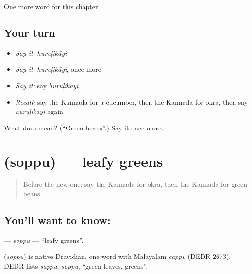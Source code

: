 \begin{grammarlens}[title={What you've built}]
One more word for this chapter.
\end{grammarlens}

\subsection*{Your turn}
\begin{itemize}
\raggedright
  \item \emph{Say it:} \emph{huruḷikāyi}
  \item \emph{Say it:} \emph{huruḷikāyi}, once more
  \item \emph{Say it:} say \emph{huruḷikāyi}
  \item \emph{Recall:} say the Kannada for a cucumber, then the Kannada for okra, then say \emph{huruḷikāyi} again
\end{itemize}

\begin{tcolorbox}[breakable,colback=teal!4,colframe=teal!35!black,title={Before you move on}]
What does  mean? (\textquotedblleft{}Green beans\textquotedblright{}.) Say it once more.
\end{tcolorbox}
\section[\texorpdfstring{\kn{ಸೊಪ್ಪು} (soppu)}{ಸೊಪ್ಪು (soppu)}]{ (soppu) — leafy greens}

\label{lesson:KA-C184-soppu}



\begin{quote}
Before the new one: say the Kannada for okra, then the Kannada for green beans.
\end{quote}

\subsection*{You'll want to know: }
\textbf{} — \emph{soppu} — \textquotedblleft{}leafy greens\textquotedblright{}.

\begin{cousinweb}
\textbf{} (\emph{soppu}) is native Dravidian, one word with Malayalam \emph{cappu} (DEDR 2673). DEDR lists \emph{sappu}, \emph{soppu}, \textquotedblleft{}green leaves, greens\textquotedblright{}.
\end{cousinweb}

